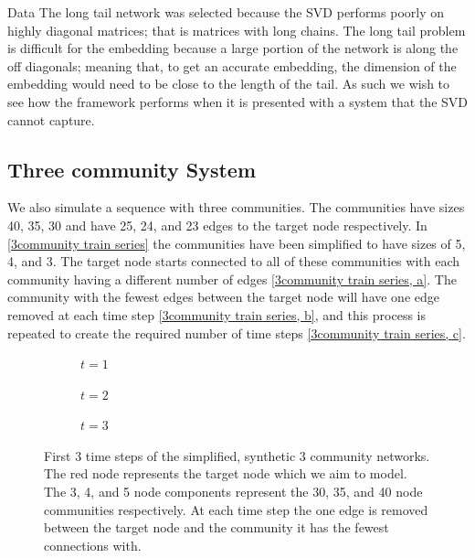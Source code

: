 \documentclass[12pt]{amsart}
\begin{document}
\begin{section}{Data}
        The long tail network was selected because the SVD performs poorly on highly diagonal matrices; that is matrices with long chains.  The long tail problem is difficult for the embedding because a large portion of the network is along the off diagonals; meaning that, to get an accurate embedding, the dimension of the embedding would need to be close to the length of the tail. As such we wish to see how the framework performs when it is presented with a system that the SVD cannot capture.

    \subsection{Three community System}
    We also simulate a sequence with three communities. The communities have sizes 40, 35, 30 and have 25, 24, and 23 edges to the target node respectively. In \autoref{3community train series} the communities have been simplified to have sizes of 5, 4, and 3. The target node starts connected to all of these communities with each community having a different number of edges \autoref{3community train series, a}. The community with the fewest edges between the target node will have one edge removed at each time step \autoref{3community train series, b}, and this process is repeated to create the required number of time steps \autoref{3community train series, c}.  
    \begin{figure}[H]
        \centering
        \centering
        \begin{subfigure}[c]{0.3\textwidth}
            \centering
            \resizebox{.6\width}{!}{}
            \caption{$t=1$}
            \label{3community train series, a}
        \end{subfigure}
        \hfill
        \centering
        \begin{subfigure}[c]{0.3\textwidth}
            \centering
            \resizebox{.6\width}{!}{}
            \caption{$t=2$}
            \label{3community train series, b}            
        \end{subfigure}
        \hfill
        \centering
        \begin{subfigure}[c]{0.3\textwidth}
            \centering
            \resizebox{.6\width}{!}{}
            \caption{$t=3$}
            \label{3community train series, c}
        \end{subfigure}
        \caption{First 3 time steps of the simplified, synthetic 3 community networks. The red node represents the target node which we aim to model. The 3, 4, and 5 node components represent the 30, 35, and 40 node communities respectively. At each time step the one edge is removed between the target node and the community it has the fewest connections with.}
        \label{3community train series}
    \end{figure}
     

\end{section}
\end{document}

